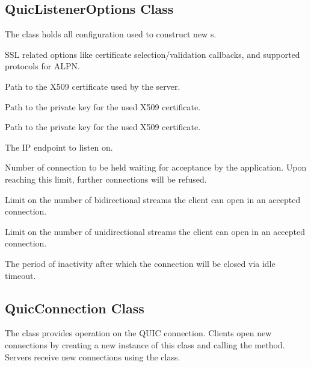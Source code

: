 \subsection{QuicListenerOptions Class}

The  class holds all configuration used to construct new s.

\begin{description}

        SSL related options like certificate selection/validation callbacks, and supported protocols for ALPN\@.

     Path to the X509 certificate used by the server.

     Path to the private key for the used X509 certificate.

     Path to the private key for the used X509 certificate.

     The IP endpoint to listen on.

     Number of connection to be held waiting for acceptance by the application. Upon reaching this limit, further connections will be refused.

     Limit on the number of bidirectional streams the client can open in an accepted connection.

     Limit on the number of unidirectional streams the client can open in an accepted connection.

     The period of inactivity after which the connection will be closed via idle timeout.

\end{description}

\subsection{QuicConnection Class}

The  class provides operation on the QUIC connection. Clients open new
connections by creating a new instance of this class and calling the  method.
Servers receive new connections using the  class.

